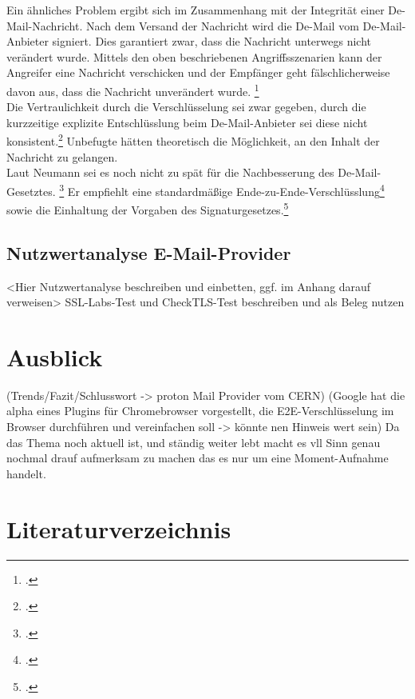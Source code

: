 \documentclass  [paper=a4,
				fontsize=12pt,
				listof=totoc,
				bibliography=totoc
				]{scrreprt}
\begin{document}
{			Ein ähnliches Problem ergibt sich im Zusammenhang mit der Integrität einer De-Mail-Nachricht.
			Nach dem Versand der Nachricht wird die De-Mail vom De-Mail-Anbieter signiert.
			Dies garantiert zwar, dass die Nachricht unterwegs nicht verändert wurde.
			Mittels den oben beschriebenen Angriffsszenarien kann der Angreifer eine Nachricht verschicken und der Empfänger geht fälschlicherweise davon aus, dass die Nachricht unverändert wurde. \footcite[Vgl.][o.S.]{Neumann2013b}\medskip\\
			
			Die Vertraulichkeit durch die Verschlüsselung sei zwar gegeben, durch die kurzzeitige explizite Entschlüsslung beim De-Mail-Anbieter sei diese nicht konsistent.\footcite[Vgl.][S. 4]{Neumann2013a}
			Unbefugte hätten theoretisch die Möglichkeit, an den Inhalt der Nachricht zu gelangen.\medskip\\
			
			Laut Neumann sei es noch nicht zu spät für die Nachbesserung des De-Mail-Gesetztes. \footcite[Vgl.][S. 6f]{Neumann2013a}
			Er empfiehlt eine standardmäßige Ende-zu-Ende-Verschlüsslung\footcite[Vgl.][S. 7,o.S.]{Neumann2013a,Neumann2013b} sowie die Einhaltung der Vorgaben des Signaturgesetzes.\footcite[Vgl.][S. 4]{Neumann2013a}
				
				
		\section{Nutzwertanalyse E-Mail-Provider}
		\label{sec:nwa}
			<Hier Nutzwertanalyse beschreiben und einbetten, ggf. im Anhang darauf verweisen>
			SSL-Labs-Test und CheckTLS-Test beschreiben und als Beleg nutzen
			
			
	\chapter{Ausblick}
		(Trends/Fazit/Schlusswort -> proton Mail Provider vom CERN)
		(Google hat die alpha eines Plugins für Chromebrowser vorgestellt, die E2E-Verschlüsselung im Browser durchführen und vereinfachen soll -> könnte nen Hinweis wert sein) 	
		Da das Thema noch aktuell ist, und ständig weiter lebt macht es vll Sinn genau nochmal drauf aufmerksam zu machen das es nur um eine Moment-Aufnahme handelt. 
		\color{black}

				
						
	\chapter*{Literaturverzeichnis}
	\fancyhead{}
	\renewcommand{\headrulewidth}{0pt}	
		\printbibliography[heading=offline,nottype=online]
		\printbibliography[heading=online,type=online]
}
\end{document}
